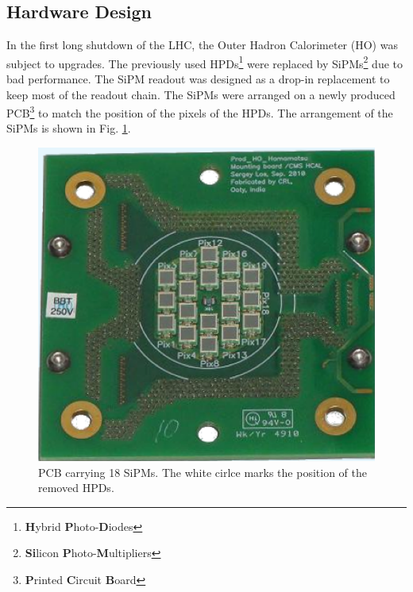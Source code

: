 \subsection{Hardware Design}\label{kuenskenHardwareDesign}
In the first long shutdown of the LHC, the Outer Hadron Calorimeter (HO) was subject to upgrades. The previously used HPDs\footnote{{\bf H}ybrid {\bf P}hoto-{\bf D}iodes} were replaced by SiPMs\footnote{{\bf Si}licon {\bf P}hoto-{\bf M}ultipliers} due to bad performance. The SiPM readout was designed as a drop-in replacement to keep most of the readout chain. The SiPMs were arranged on a newly produced PCB\footnote{{\bf P}rinted {\bf C}ircuit {\bf B}oard} to match the position of the pixels of the HPDs. The arrangement of the SiPMs is shown in Fig. \ref{kuenskensipmPcb}.
\begin{figure}[h]
\centering
\begin{minipage}[t]{0.475\textwidth}
\includegraphics[width=\textwidth]{Figures/kuensken/pcbSipm.png}
\caption{PCB carrying 18 SiPMs. The white cirlce marks the position of the removed HPDs.}
\label{kuenskensipmPcb}
\end{minipage}
\hspace{1cm}
\begin{minipage}[t]{0.435\textwidth}

\end{minipage}
\end{figure}
